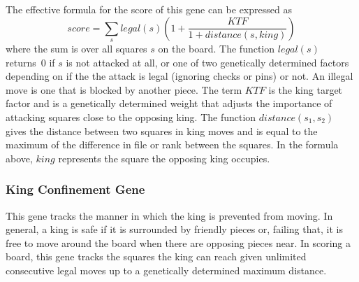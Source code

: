 \documentclass[letterpaper]{article}
\renewcommand{\_}{\allowbreak\textunderscore\allowbreak}
\begin{document}
The effective formula for the score of this gene can be expressed as
\[score = \sum_s legal(s)\left(1+\frac{KTF}{1+distance(s,king)}\right)\]
where the sum is over all squares \(s\) on the board. The function \(legal(s)\) returns~0 if \(s\) is not attacked at all, or one of two genetically determined factors depending on if the the attack is legal (ignoring checks or pins) or not. An illegal move is one that is blocked by another piece. The term \(KTF\) is the king target factor and is a genetically determined weight that adjusts the importance of attacking squares close to the opposing king. The function \(distance(s_1, s_2)\) gives the distance between two squares in king moves and is equal to the maximum of the difference in file or rank between the squares. In the formula above, \(king\) represents the square the opposing king occupies.

\subsubsection{King Confinement Gene}
This gene tracks the manner in which the king is prevented from moving. In general, a king is safe if it is surrounded by friendly pieces or, failing that, it is free to move around the board when there are opposing pieces near. In scoring a board, this gene tracks the squares the king can reach given unlimited consecutive legal moves up to a genetically determined maximum distance.
\end{document}
